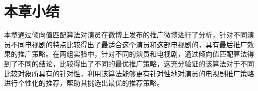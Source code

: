 \section{本章小结}

本章通过倾向值匹配算法对演员在微博上发布的推广微博进行了分析，针对不同演员不同电视剧的特点比较得出了最适合这个演员和这部电视剧的，具有最后推广效果的推广策略。在两组实验中，针对不同的演员和电视剧，通过倾向值匹配算法得到了不同的结论，比较得出了不同的最优推广策略，这充分验证的该算法对于不同比较对象所具有的针对性，利用该算法能够更有针对性地对演员的电视剧推广策略进行个性化的推荐，帮助其挑选出最优的推荐策略。



































